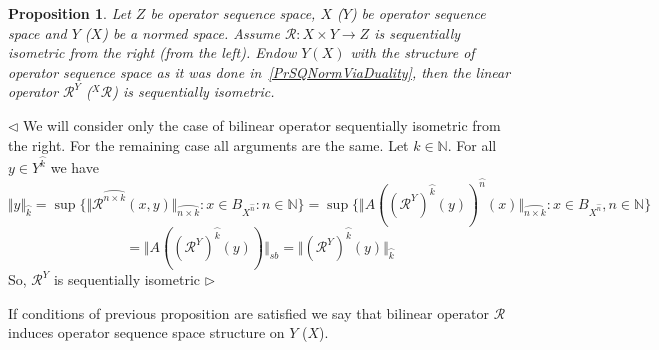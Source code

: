 \documentclass[12pt]{article}
\newtheorem{proposition}[theorem]{Proposition}
\newenvironment{proof}{\par $\triangleleft$}{$\triangleright$}
\begin{document}
\begin{proposition}\label{PrFreezIsomSQIsom}
Let $Z$ be operator sequence space, $X$ ($Y$) be operator sequence space 
and $Y$ ($X$) be a normed space. Assume $\mathcal{R}:X\times Y\to Z$ is 
sequentially isometric from the right (from the left). Endow $Y(X)$ with the 
structure of operator sequence space as it was done in~\ref{PrSQNormViaDuality}, 
then the linear operator $\mathcal{R}^Y$ (${}^X\mathcal{R}$) is sequentially 
isometric.
\end{proposition}
\begin{proof}
We will consider only the case of bilinear operator sequentially isometric from 
the right. For the remaining case all arguments are the same. Let 
$k\in\mathbb{N}$. For all $y\in Y^{\wideparen{k}}$ we have
$$
\Vert y\Vert_{\wideparen{k}}
=\sup \{
    \Vert
        \mathcal{R}^{\wideparen{n\times k}}(x,y)
    \Vert_{\wideparen{n\times k}}
    :x\in B_{X^{\wideparen{n}}}
    :n\in\mathbb{N} \}
=\sup \{
    \Vert
        {A({(\mathcal{R}^Y)}^{\wideparen{k}}(y))}^{\wideparen{n}}(x)
    \Vert_{\wideparen{n\times k}}
    :x\in B_{X^{\wideparen{n}}}, n\in\mathbb{N}
 \}
$$
$$
=\Vert A({(\mathcal{R}^Y)}^{\wideparen{k}}(y))\Vert_{sb} 
=\Vert{(\mathcal{R}^Y)}^{\wideparen{k}}(y)\Vert_{\wideparen{k}}
$$
So, $\mathcal{R}^Y$ is sequentially isometric
\end{proof}

If conditions of previous proposition are satisfied we say that bilinear 
operator $\mathcal{R}$ induces operator sequence space structure on $Y$ ($X$).
\end{document}
